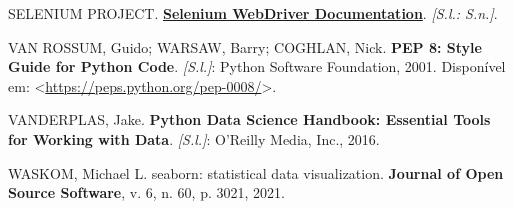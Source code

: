 \documentclass[
  brazilian,
  letterpaper,
  DIV=11,
  numbers=noendperiod]{scrreprt}
\newlength{\cslhangindent}
\newenvironment{CSLReferences}[2] %
 {\begin{list}{}{%
  \setlength{\itemindent}{0pt}
  \setlength{\leftmargin}{0pt}
  \setlength{\parsep}{0pt}
  \ifodd #1
   \setlength{\leftmargin}{\cslhangindent}
   \setlength{\itemindent}{-1\cslhangindent}
  \fi
  \setlength{\itemsep}{#2\baselineskip}}}
 {\end{list}}
\begin{document}
\begin{CSLReferences}{0}{1}
SELENIUM PROJECT.
\textbf{\href{https://www.selenium.dev/documentation/webdriver/}{Selenium
WebDriver Documentation}}. \emph{{[}S.l.: S.n.{]}}.

VAN ROSSUM, Guido; WARSAW, Barry; COGHLAN, Nick. \textbf{PEP 8: Style
Guide for Python Code}. \emph{{[}S.l.{]}}: Python Software Foundation,
2001. Disponível em:
\textless{}\url{https://peps.python.org/pep-0008/}\textgreater.

VANDERPLAS, Jake. \textbf{Python Data Science Handbook: Essential Tools
for Working with Data}. \emph{{[}S.l.{]}}: O'Reilly Media, Inc., 2016.

WASKOM, Michael L. seaborn: statistical data visualization.
\textbf{Journal of Open Source Software}, v. 6, n. 60, p. 3021, 2021.

\end{CSLReferences}
\end{document}
